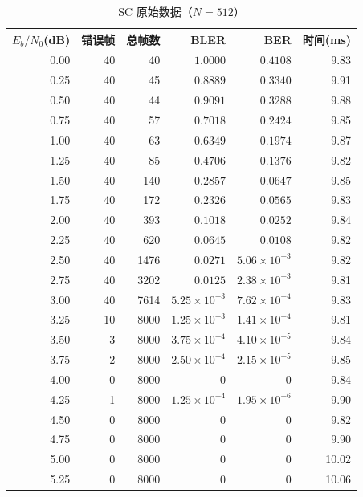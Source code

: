 \documentclass[12pt, a4paper]{article}
\begin{document}
\begin{table}[H]
\centering\caption{SC 原始数据（$N=512$）}\small
\begin{tabular}{rrrrrr}
\toprule
$E_b/N_0$(dB) & 错误帧 & 总帧数 & BLER & BER & 时间(ms) \\
\midrule
0.00 & 40 & 40 & $1.0000$ & $0.4108$ & 9.83 \\
0.25 & 40 & 45 & $0.8889$ & $0.3340$ & 9.91 \\
0.50 & 40 & 44 & $0.9091$ & $0.3288$ & 9.88 \\
0.75 & 40 & 57 & $0.7018$ & $0.2424$ & 9.85 \\
1.00 & 40 & 63 & $0.6349$ & $0.1974$ & 9.87 \\
1.25 & 40 & 85 & $0.4706$ & $0.1376$ & 9.82 \\
1.50 & 40 & 140 & $0.2857$ & $0.0647$ & 9.85 \\
1.75 & 40 & 172 & $0.2326$ & $0.0565$ & 9.83 \\
2.00 & 40 & 393 & $0.1018$ & $0.0252$ & 9.84 \\
2.25 & 40 & 620 & $0.0645$ & $0.0108$ & 9.82 \\
2.50 & 40 & 1476 & $0.0271$ & $5.06\times10^{-3}$ & 9.82 \\
2.75 & 40 & 3202 & $0.0125$ & $2.38\times10^{-3}$ & 9.81 \\
3.00 & 40 & 7614 & $5.25\times10^{-3}$ & $7.62\times10^{-4}$ & 9.83 \\
3.25 & 10 & 8000 & $1.25\times10^{-3}$ & $1.41\times10^{-4}$ & 9.81 \\
3.50 & 3 & 8000 & $3.75\times10^{-4}$ & $4.10\times10^{-5}$ & 9.84 \\
3.75 & 2 & 8000 & $2.50\times10^{-4}$ & $2.15\times10^{-5}$ & 9.85 \\
4.00 & 0 & 8000 & $0$ & $0$ & 9.84 \\
4.25 & 1 & 8000 & $1.25\times10^{-4}$ & $1.95\times10^{-6}$ & 9.90 \\
4.50 & 0 & 8000 & $0$ & $0$ & 9.82 \\
4.75 & 0 & 8000 & $0$ & $0$ & 9.90 \\
5.00 & 0 & 8000 & $0$ & $0$ & 10.02 \\
5.25 & 0 & 8000 & $0$ & $0$ & 10.06 \\
\bottomrule
\end{tabular}
\end{table}
\end{document}
